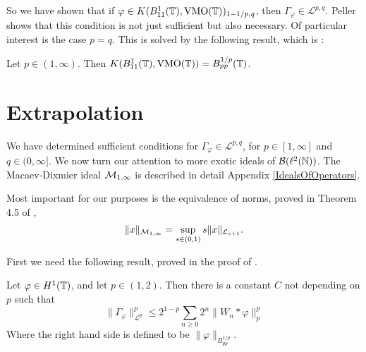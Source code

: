 


So we have shown that if $\varphi \in K(B_{11}^1(\mathbb{T}),\operatorname{VMO}(\mathbb{T}))_{1-1/p,q}$,
then $\Gamma_\varphi \in \mathcal{L}^{p,q}$. Peller \cite[Theorem 4.4, p. 256]{Peller2003} shows
that this condition is not just sufficient but also necessary. Of particular interest
is the case $p = q$. This is solved by the following result, which is \cite[Theorem 4.3, p.255]{Peller2003}:
\begin{proposition}
    Let $p \in (1,\infty)$. Then $K(B_{11}^1(\mathbb{T}),\operatorname{VMO}(\mathbb{T})) = B_{pp}^{1/p}(\mathbb{T})$. 
\end{proposition}

\section{Extrapolation}
We have determined sufficient conditions for $\Gamma_\varphi \in \mathcal{L}^{p,q}$,
for $p \in [1,\infty]$ and $q \in (0,\infty]$.
We now turn our attention to more exotic ideals of $\mathcal{B}(\ell^2(\mathbb{N}))$. The
Macaev-Dixmier ideal $\mathcal{M}_{1,\infty}$ is described in detail Appendix \ref{IdealsOfOperators}.

Most important for our purposes is the equivalence of norms, proved in Theorem 4.5 of \cite{CRSS},
\begin{equation}
    \|x\|_{\mathcal{M}_{1,\infty}} = \sup_{s \in (0,1)} s\|x\|_{\mathcal{L}_{s+1}}.
\end{equation}

First we need the following result, proved in the proof of \cite[Theorem 3.1,p.250]{Peller2003}.
\begin{proposition}
    Let $\varphi \in H^1(\mathbb{T})$, and let $p \in (1,2)$. Then there is a constant $C$
    not depending on $p$ such that
    \begin{equation}
        \|\Gamma_{\varphi}\|_{\mathcal{L}^p}^p \leq 2^{1-p} \sum_{n\geq 0} 2^n\|W_n*\varphi\|_p^p
    \end{equation}
    Where the right hand side is defined to be $\|\varphi\|_{B_{pp}^{1/p}}$.
\end{proposition}

